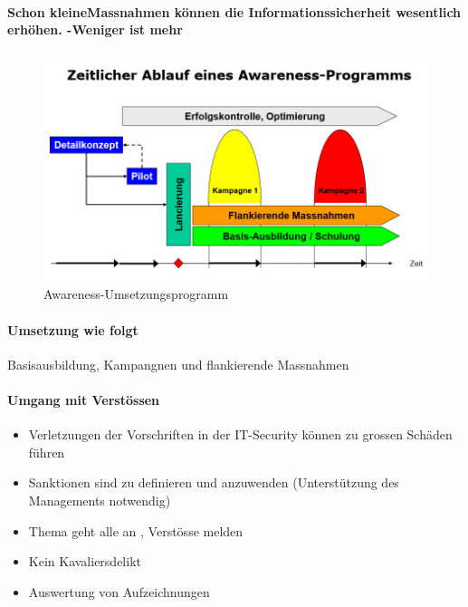 \documentclass[10pt,a4paper]{article}
\begin{document}
\paragraph*{Schon  	\flqq kleine\frqq  Massnahmen können die Informationssicherheit wesentlich erhöhen. -\frq  \flqq Weniger ist mehr\frqq}


\begin{figure}[H]
    \begin{center}
    \includegraphics[width=15cm]{images/Umsetzung_Awareness-Programm.png}
    \caption{Awareness-Umsetzungsprogramm}
    \label{Awareness-Umsetzungsprogramm}
    \end{center}
\end{figure}

\paragraph*{Umsetzung wie folgt} Basisausbildung, Kampangnen und flankierende Massnahmen
\paragraph*{Umgang mit Verstössen}
\begin{itemize}[noitemsep,topsep=0pt,leftmargin=*]
    \item Verletzungen der Vorschriften in der IT-Security können zu grossen Schäden führen
    \item Sanktionen sind zu definieren und anzuwenden (Unterstützung des Managements notwendig)
    \item \flqq Thema geht alle an \frqq, Verstösse melden
    \item Kein Kavaliersdelikt
    \item Auswertung von Aufzeichnungen
\end{itemize}
\end{document}
